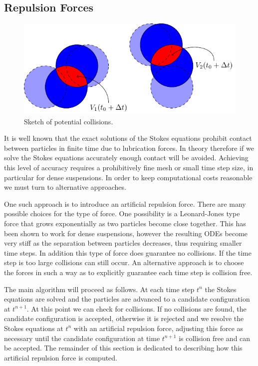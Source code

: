 \documentclass[preprint, 10pt]{elsarticle}
\begin{document}
\subsection{Repulsion Forces}

\begin{figure}[!h]\label{fig:collision_sketch}
\begin{center}
\includegraphics{figures/collisions.pdf}
\end{center}
\caption{Sketch of potential collisions.}
\end{figure}
It is well known that the exact solutions of the Stokes equations prohibit contact between particles in finite time due to lubrication forces. In theory therefore if we solve the Stokes equations accurately enough contact will be avoided. Achieving this level of accuracy requires a prohibitively fine mesh or small time step size, in particular for dense suspensions. In order to keep computational costs reasonable we must turn to alternative approaches. 

One such approach is to introduce an artificial repulsion force. There are many possible choices for the type of force. One possibility is a Leonard-Jones type force that grows exponentially as two particles become close together. This has been shown to work for dense suspensions, however the resulting ODEs become very stiff as the separation between particles decreases, thus requiring smaller time steps. In addition this type of force does guarantee no collisions. If the time step is too large collisions can still occur. An alternative approach is to choose the forces in such a way as to explicitly guarantee each time step is collision free. 

The main algorithm will proceed as follows. At each time step $t^n$ the Stokes equations are solved and the particles are advanced to a candidate configuration at $t^{n+1}$. At this point we can check for collisions. If no collisions are found, the candidate configuration is accepted, otherwise it is rejected and we resolve the Stokes equations at $t^n$ with an artificial repulsion force, adjusting this force as necessary until the candidate configuration at time $t^{n+1}$ is collision free and can be accepted. The remainder of this section is dedicated to describing how this artificial repulsion force is computed. 
\end{document}
